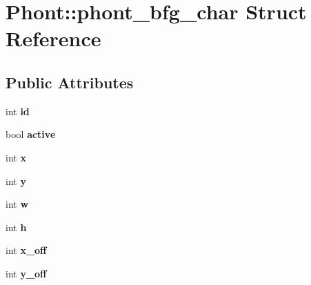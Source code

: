 \hypertarget{struct_phont_1_1phont__bfg__char}{\section{Phont\-:\-:phont\-\_\-bfg\-\_\-char Struct Reference}
\label{struct_phont_1_1phont__bfg__char}
}
\subsection*{Public Attributes}
\begin{DoxyCompactItemize}
\item 
\hypertarget{struct_phont_1_1phont__bfg__char_abe78c895ffcf516b2c639b9f1a620b1c}{int {\bfseries id}}\label{struct_phont_1_1phont__bfg__char_abe78c895ffcf516b2c639b9f1a620b1c}

\item 
\hypertarget{struct_phont_1_1phont__bfg__char_ab8436a5cbfb55c028445de3ebcc4c975}{bool {\bfseries active}}\label{struct_phont_1_1phont__bfg__char_ab8436a5cbfb55c028445de3ebcc4c975}

\item 
\hypertarget{struct_phont_1_1phont__bfg__char_a74fc475df45e6673edc3c265563d0ff3}{int {\bfseries x}}\label{struct_phont_1_1phont__bfg__char_a74fc475df45e6673edc3c265563d0ff3}

\item 
\hypertarget{struct_phont_1_1phont__bfg__char_aaa12019d5c622af917567fd980a1ad6c}{int {\bfseries y}}\label{struct_phont_1_1phont__bfg__char_aaa12019d5c622af917567fd980a1ad6c}

\item 
\hypertarget{struct_phont_1_1phont__bfg__char_aa0fa5ba6587d6e4ceb0a36d7e5cfde7f}{int {\bfseries w}}\label{struct_phont_1_1phont__bfg__char_aa0fa5ba6587d6e4ceb0a36d7e5cfde7f}

\item 
\hypertarget{struct_phont_1_1phont__bfg__char_a90c4e13331b5330bd833dde3d271ce25}{int {\bfseries h}}\label{struct_phont_1_1phont__bfg__char_a90c4e13331b5330bd833dde3d271ce25}

\item 
\hypertarget{struct_phont_1_1phont__bfg__char_a2493d2f0b633b02fbca17c9cc3fcb560}{int {\bfseries x\-\_\-off}}\label{struct_phont_1_1phont__bfg__char_a2493d2f0b633b02fbca17c9cc3fcb560}

\item 
\hypertarget{struct_phont_1_1phont__bfg__char_a667072c8925dc5c01001a42a30e5ce2f}{int {\bfseries y\-\_\-off}}\label{struct_phont_1_1phont__bfg__char_a667072c8925dc5c01001a42a30e5ce2f}


\end{DoxyCompactItemize}
